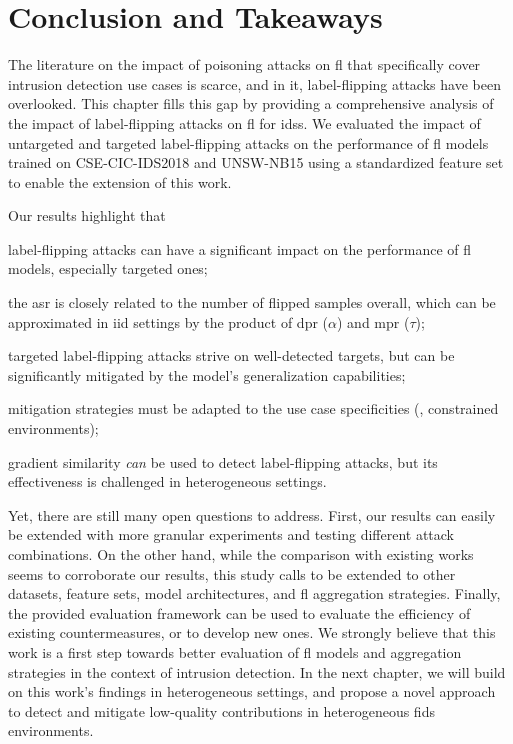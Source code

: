 \section{Conclusion and Takeaways\label{sec:assess.conclusion}}

The literature on the impact of poisoning attacks on \gls{fl} that specifically cover intrusion detection use cases is scarce, and in it, label-flipping attacks have been overlooked.
This chapter fills this gap by providing a comprehensive analysis of the impact of label-flipping attacks on \gls{fl} for \glspl{ids}.
We evaluated the impact of untargeted and targeted label-flipping attacks on the performance of \gls{fl} models trained on CSE-CIC-IDS2018 and UNSW-NB15 using a standardized feature set to enable the extension of this work.

Our results highlight that
\begin{enumerate*}[(i)]
  \item label-flipping attacks can have a significant impact on the performance of \gls{fl} models, especially targeted ones;
  \item the \gls{asr} is closely related to the number of flipped samples overall, which can be approximated in \gls{iid} settings by the product of \gls{dpr} ($\alpha$) and \gls{mpr} ($\tau$); 
  \item targeted label-flipping attacks strive on well-detected targets, but can be significantly mitigated by the model's generalization capabilities;
  \item mitigation strategies must be adapted to the use case specificities (\eg, constrained environments);
  \item gradient similarity \emph{can} be used to detect label-flipping attacks, but its effectiveness is challenged in heterogeneous settings.
\end{enumerate*}

Yet, there are still many open questions to address.
First, our results can easily be extended with more granular experiments and testing different attack combinations.
On the other hand, while the comparison with existing works seems to corroborate our results, this study calls to be extended to other datasets, feature sets, model architectures, and \gls{fl} aggregation strategies.
Finally, the provided evaluation framework can be used to evaluate the efficiency of existing countermeasures, or to develop new ones.
We strongly believe that this work is a first step towards better evaluation of \gls{fl} models and aggregation strategies in the context of intrusion detection.
In the next chapter, we will build on this work's findings in heterogeneous settings, and propose a novel approach to detect and mitigate low-quality contributions in heterogeneous \gls{fids} environments.


